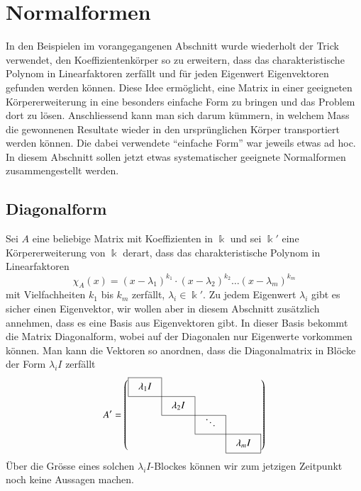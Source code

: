 %
%
%
\section{Normalformen
\label{buch:section:normalformen}}
In den Beispielen im vorangegangenen Abschnitt wurde wiederholt der Trick
verwendet, den Koeffizientenkörper so zu erweitern, dass das
charakteristische Polynom in Linearfaktoren zerfällt und 
für jeden Eigenwert Eigenvektoren gefunden werden können.
Diese Idee ermöglicht, eine Matrix in einer geeigneten Körpererweiterung
in eine besonders einfache Form zu bringen und das Problem dort zu lösen.
Anschliessend kann man sich darum kümmern, in welchem Mass die gewonnenen
Resultate wieder in den ursprünglichen Körper transportiert werden können.
Die dabei verwendete ``einfache Form'' war jeweils etwas ad hoc.
In diesem Abschnitt sollen jetzt etwas systematischer geeignete Normalformen
zusammengestellt werden.

\subsection{Diagonalform}
%
Sei $A$ eine beliebige Matrix mit Koeffizienten in $\Bbbk$ und sei $\Bbbk'$
eine Körpererweiterung von $\Bbbk$ derart, dass das charakteristische
Polynom in Linearfaktoren
\[
\chi_A(x)
=
(x-\lambda_1)^{k_1}\cdot (x-\lambda_2)^{k_2}\dots(x-\lambda_m)^{k_m}
\]
mit Vielfachheiten $k_1$ bis $k_m$ zerfällt, $\lambda_i\in\Bbbk'$.
Zu jedem Eigenwert $\lambda_i$ gibt es sicher einen Eigenvektor, wir 
wollen aber in diesem Abschnitt zusätzlich annehmen, dass es eine Basis
aus Eigenvektoren gibt.
In dieser Basis bekommt die Matrix Diagonalform, wobei auf der 
Diagonalen nur Eigenwerte vorkommen können.
Man kann die Vektoren so anordnen, dass die Diagonalmatrix in Blöcke
der Form $\lambda_iI$ zerfällt
\[
\def\temp#1{\multicolumn{1}{|c}{\raisebox{0pt}[12pt][7pt]{\phantom{x}$#1$}\phantom{x}}}
A'
=\left(
\begin{array}{cccc}
\cline{1-1}
\temp{\lambda_1I} &\multicolumn{1}{|c}{}&        &           \\
\cline{1-2}
          &\temp{\lambda_2I}&\multicolumn{1}{|c}{}&           \\
\cline{2-3}
          &           &\temp{\ddots}&\multicolumn{1}{|c}{}\\
\cline{3-4}
          &           &        &\multicolumn{1}{|c|}{\raisebox{0pt}[12pt][7pt]{\phantom{x}$\lambda_mI$}\phantom{x}}\\
\cline{4-4}
\end{array}
\right)
\]
Über die Grösse eines solchen $\lambda_iI$-Blockes können wir zum jetzigen
Zeitpunkt noch keine Aussagen machen.

